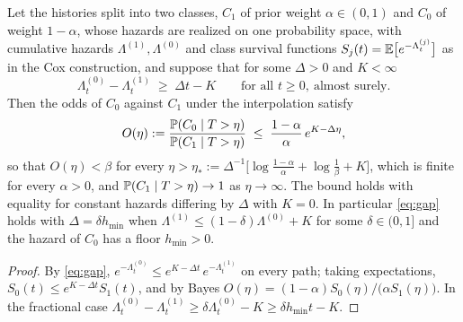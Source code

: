 \begin{proposition}\label{prop:select}
Let the histories split into two classes, $C_1$ of prior weight
$\alpha\in(0,1)$ and $C_0$ of weight $1-\alpha$, whose hazards are
realized on one probability space, with cumulative hazards
$\Lambda^{(1)},\Lambda^{(0)}$ and class survival functions
$S_j(t)=\mathbb{E}\bigl[e^{-\Lambda^{(j)}_t}\bigr]$ as in the Cox construction,
and suppose that for some $\Delta>0$ and $K<\infty$
\begin{equation}\label{eq:gap}
\Lambda^{(0)}_t-\Lambda^{(1)}_t\;\ge\;\Delta t-K
\qquad\text{for all }t\ge0,\ \text{almost surely}.
\end{equation}
Then the odds of $C_0$ against $C_1$ under the interpolation satisfy
\begin{equation}\label{eq:selectodds}
O(\eta):=\frac{\mathbb{P}(C_0\mid T>\eta)}{\mathbb{P}(C_1\mid T>\eta)}
\;\le\;\frac{1-\alpha}{\alpha}\,e^{K-\Delta\eta},
\end{equation}
so that $O(\eta)<\beta$ for every $\eta>\eta_\ast:=\Delta^{-1}
\bigl[\log\tfrac{1-\alpha}{\alpha}+\log\tfrac1\beta+K\bigr]$, which is
finite for every $\alpha>0$, and $\mathbb{P}(C_1\mid T>\eta)\to1$ as
$\eta\to\infty$. The bound holds with equality for constant hazards
differing by $\Delta$ with $K=0$. In particular \eqref{eq:gap} holds with
$\Delta=\delta h_{\min}$ when
$\Lambda^{(1)}\le(1-\delta)\Lambda^{(0)}+K$ for some $\delta\in(0,1]$
and the hazard of $C_0$ has a floor $h_{\min}>0$.
\end{proposition}

\begin{proof}
By \eqref{eq:gap}, $e^{-\Lambda^{(0)}_t}\le e^{K-\Delta t}\,
e^{-\Lambda^{(1)}_t}$ on every path; taking expectations,
$S_0(t)\le e^{K-\Delta t}S_1(t)$, and by Bayes
$O(\eta)=(1-\alpha)S_0(\eta)/\bigl(\alpha S_1(\eta)\bigr)$. In the
fractional case $\Lambda^{(0)}_t-\Lambda^{(1)}_t\ge\delta\Lambda^{(0)}_t-K
\ge\delta h_{\min}t-K$.
\end{proof}

